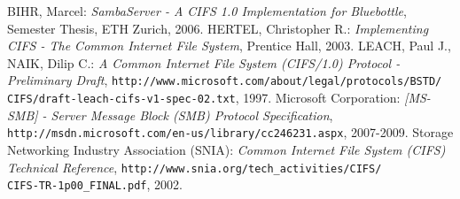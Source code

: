 \documentclass[11pt,a4paper]{book}
\begin{document}
\begin{thebibliography}{LeachNaik}
 BIHR, Marcel: \textit{SambaServer - A CIFS 1.0 Implementation for Bluebottle}, Semester Thesis, ETH Zurich, 2006.
 HERTEL, Christopher R.: \textit{Implementing CIFS - The Common Internet File System}, Prentice Hall, 2003.
 LEACH, Paul J., NAIK, Dilip C.: \textit{A Common Internet File System (CIFS/1.0) Protocol - Preliminary Draft}, \texttt{http://www.microsoft.com/about/legal/protocols/BSTD/\\CIFS/draft-leach-cifs-v1-spec-02.txt}, 1997.
 Microsoft Corporation: \textit{[MS-SMB] - Server Message Block (SMB) Protocol Specification}, \texttt{http://msdn.microsoft.com/en-us/library/cc246231.aspx}, 2007-2009.
 Storage Networking Industry Association (SNIA): \textit{Common Internet File System (CIFS) Technical Reference}, \texttt{http://www.snia.org/tech\_activities/CIFS/\\CIFS-TR-1p00\_FINAL.pdf}, 2002.
 
\end{thebibliography}
\end{document}
